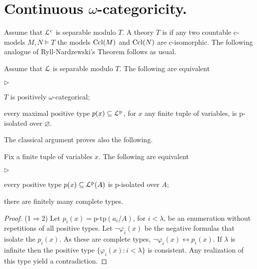 \documentclass[10pt,oneside]{amsproc}
\newcommand{\mylabel}[1]{{#1}\hfill}
\renewenvironment{itemize}
  {\begin{list}{$\triangleright$}{%
  \setlength{\parskip}{0mm}
  \setlength{\topsep}{.4\baselineskip}
  \setlength{\rightmargin}{0mm}
  \setlength{\listparindent}{0mm}
  \setlength{\itemindent}{0mm}
  \setlength{\labelwidth}{3ex}
  \setlength{\itemsep}{.2\baselineskip}
  \setlength{\parsep}{.2\baselineskip}
  \setlength{\partopsep}{0mm}
  \setlength{\labelsep}{1ex}
  \setlength{\leftmargin}{\labelwidth+\labelsep}
  \let\makelabel\mylabel}}{%
\end{list}}
\renewcommand*{\emph}[1]{%
   \smash{\tikz[baseline]\node[rectangle, fill=teal!25, rounded corners, inner xsep=0.5ex, inner ysep=0.2ex, anchor=base, minimum height = 2.7ex]{\strut #1};}}
\begin{document}
{%
\section{Continuous $\omega$-categoricity.}


Assume that ${\EuScript L}^{\rm c}$ is separable modulo $T$.
A theory $T$ is \emph{c-$\omega$-categorical\/} if any two countable c-models $M,N\models T$ the models ${\rm Ccl}(M)$ and ${\rm Ccl}(N)$ are c-isomorphic.
The following analogue of Ryll-Nardzewski's Theorem follows as usual.

\begin{theorem}
  Assume that ${\EuScript L}$ is separable modulo $T$.
  The following are equivalent
  \begin{itemize}
    \item[1.] $T$ is positively $\omega$-categorical;
    \item[2.] every maximal positive type $p(x)\subseteq{\EuScript L}^{\rm p}$, for $x$ any finite tuple of variables, is p-isolated over $\varnothing$.
  \end{itemize}
\end{theorem}

The classical argument proves also the following.

\begin{proposition}
  Fix a finite tuple of variables $x$.
  The following are equivalent
  \begin{itemize}
    \item[1.] every positive type $p(x)\subseteq{\EuScript L}^{\rm p}(A)$ is p-isolated over $A$;
    \item[2.] there are finitely many complete types.
  \end{itemize}
\end{proposition}

\begin{proof}
  (1$\Rightarrow$2) 
  Let $p_i(x)=\mbox{p-tp}(a_i/A)$, for $i<\lambda$, be an enumeration without repetitions of all positive types.
  Let $\neg\varphi_i(x)$ be the negative formulas that isolate the $p_i(x)$.
  As these are complete types, $\neg\varphi_i(x)\leftrightarrow p_i(x)$.
  If $\lambda$ is infinite then the positive type $\{\varphi_i(x):i<\lambda\}$ is consistent.
  Any realization of this type yield a contradiction.


\end{proof}}
\end{document}
